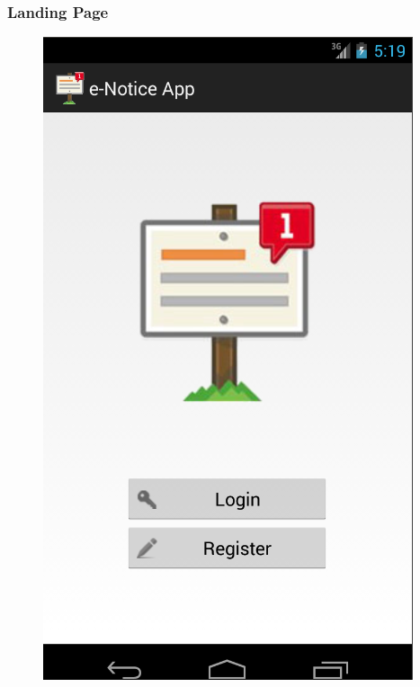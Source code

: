 \documentclass{beamer}   %
\begin{document}
\begin{frame}
\frametitle{Landing Page}
\begin{figure}
\includegraphics[scale=0.2]{image/landing.png}

\end{figure}
\end{frame}
\end{document}
